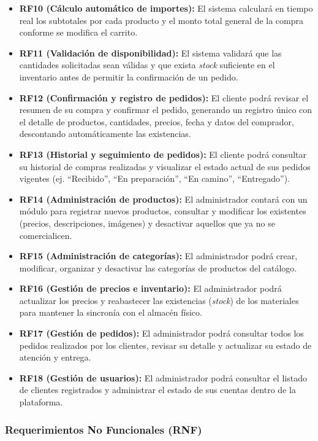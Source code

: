 \begin{itemize}
    \item \textbf{RF10 (Cálculo automático de importes):} El sistema calculará en tiempo real los subtotales por cada producto y el monto total general de la compra conforme se modifica el carrito.
    \item \textbf{RF11 (Validación de disponibilidad):} El sistema validará que las cantidades solicitadas sean válidas y que exista \textit{stock} suficiente en el inventario antes de permitir la confirmación de un pedido.
    \item \textbf{RF12 (Confirmación y registro de pedidos):} El cliente podrá revisar el resumen de su compra y confirmar el pedido, generando un registro único con el detalle de productos, cantidades, precios, fecha y datos del comprador, descontando automáticamente las existencias.
    \item \textbf{RF13 (Historial y seguimiento de pedidos):} El cliente podrá consultar su historial de compras realizadas y visualizar el estado actual de sus pedidos vigentes (ej. ``Recibido'', ``En preparación'', ``En camino'', ``Entregado'').
    \item \textbf{RF14 (Administración de productos):} El administrador contará con un módulo para registrar nuevos productos, consultar y modificar los existentes (precios, descripciones, imágenes) y desactivar aquellos que ya no se comercialicen.
    \item \textbf{RF15 (Administración de categorías):} El administrador podrá crear, modificar, organizar y desactivar las categorías de productos del catálogo.
    \item \textbf{RF16 (Gestión de precios e inventario):} El administrador podrá actualizar los precios y reabastecer las existencias (\textit{stock}) de los materiales para mantener la sincronía con el almacén físico.
    \item \textbf{RF17 (Gestión de pedidos):} El administrador podrá consultar todos los pedidos realizados por los clientes, revisar su detalle y actualizar su estado de atención y entrega.
    \item \textbf{RF18 (Gestión de usuarios):} El administrador podrá consultar el listado de clientes registrados y administrar el estado de sus cuentas dentro de la plataforma.
\end{itemize}

\subsubsection{Requerimientos No Funcionales (RNF)}

